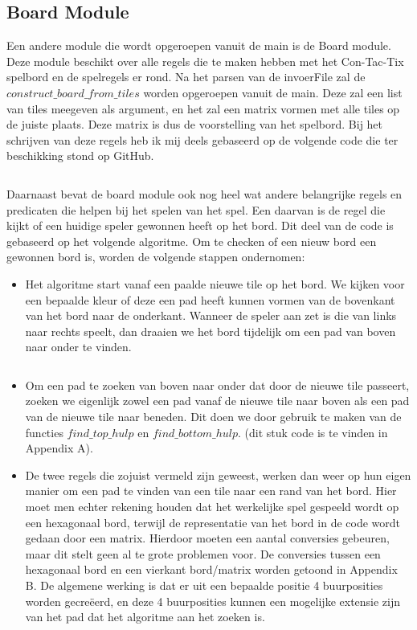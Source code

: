 \documentclass{article}
\begin{document}
\subsection{Board Module}
Een andere module die wordt opgeroepen vanuit de main is de Board module. Deze module beschikt over alle regels die te maken hebben met het Con-Tac-Tix spelbord en de spelregels er rond. Na het parsen van de invoerFile zal de $construct\_board\_from\_tiles$ worden opgeroepen vanuit de main. Deze zal een list van tiles meegeven als argument, en het zal een matrix vormen met alle tiles op de juiste plaats. Deze matrix is dus de voorstelling van het spelbord.\newline
Bij het schrijven van deze regels heb ik mij deels gebaseerd op de volgende code die ter beschikking stond op GitHub.\cite{githubmatrix, transposematrix}
\inputminted[firstline=15, lastline=21, linenos, breaklines]{prolog}{/Users/Victor/Documents/UGent/3BI/Logisch/Project/project/src/board.pl}
Daarnaast bevat de board module ook nog heel wat andere belangrijke regels en predicaten die helpen bij het spelen van het spel. Een daarvan is de regel die kijkt of een huidige speler gewonnen heeft op het bord. Dit deel van de code is gebaseerd op het volgende algoritme. Om te checken of een nieuw bord een gewonnen bord is, worden de volgende stappen ondernomen:
\begin{itemize}
\item Het algoritme start vanaf een paalde nieuwe tile op het bord. We kijken voor een bepaalde kleur of deze een pad heeft kunnen vormen van de bovenkant van het bord naar de onderkant. Wanneer de speler aan zet is die van links naar rechts speelt, dan draaien we het bord tijdelijk om een pad van boven naar onder te vinden.
\inputminted[firstline=98, lastline=102, linenos, breaklines]{prolog}{/Users/Victor/Documents/UGent/3BI/Logisch/Project/project/src/board.pl}
\item Om een pad te zoeken van boven naar onder dat door de nieuwe tile passeert, zoeken we eigenlijk zowel een pad vanaf de nieuwe tile naar boven als een pad van de nieuwe tile naar beneden. Dit doen we door gebruik te maken van de functies $find\_top\_hulp$ en $find\_bottom\_hulp$. (dit stuk code is te vinden in Appendix A).
\item De twee regels die zojuist vermeld zijn geweest, werken dan weer op hun eigen manier om een pad te vinden van een tile naar een rand van het bord. Hier moet men echter rekening houden dat het werkelijke spel gespeeld wordt op een hexagonaal bord, terwijl de representatie van het bord in de code wordt gedaan door een matrix. Hierdoor moeten een aantal conversies gebeuren, maar dit stelt geen al te grote problemen voor. De conversies tussen een hexagonaal bord en een vierkant bord/matrix worden getoond in Appendix B. De algemene werking is dat er uit een bepaalde positie 4 buurposities worden gecreëerd, en deze 4 buurposities kunnen een mogelijke extensie zijn van het pad dat het algoritme aan het zoeken is.
\end{itemize}
\end{document}
